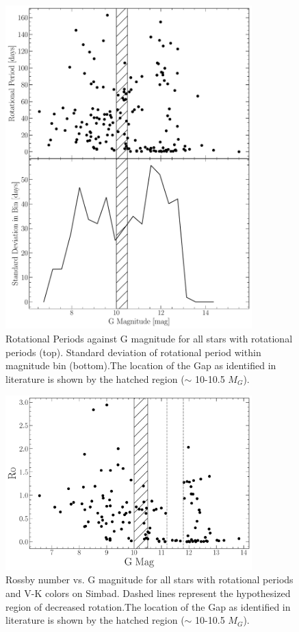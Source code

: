 \begin{figure}
  \centering
  \includegraphics[width=0.85\textwidth]{figures/jaoMagActivity/RotationSignifigance.pdf}
  \caption{Rotational Periods against G magnitude for all stars with rotational
  periods (top). Standard deviation of rotational period within magnitude bin (bottom).The location of the Gap
  as identified in literature is shown by the hatched region ($\sim$ 10-10.5 $M_{G}$).}
  \label{fig:rotationalSignifigance}
\end{figure}

\begin{figure}
  \centering
  \includegraphics[width=0.85\textwidth]{figures/jaoMagActivity/Rossby.pdf}
  \caption{Rossby number vs. G magnitude for all stars with rotational periods
  and V-K colors on Simbad. Dashed lines represent the hypothesized region of decreased rotation.The location of the Gap
  as identified in literature is shown by the hatched region ($\sim$ 10-10.5 $M_{G}$).}
  \label{fig:rossby}
\end{figure}


